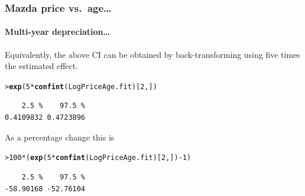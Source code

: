 \documentclass{beamer}\usepackage[]{graphicx}\usepackage[]{xcolor}
\makeatletter
\newcommand{\hlnum}[1]{\textcolor[rgb]{0.686,0.059,0.569}{#1}}%
\newcommand{\hlopt}[1]{\textcolor[rgb]{0,0,0}{#1}}%
\newcommand{\hlstd}[1]{\textcolor[rgb]{0.345,0.345,0.345}{#1}}%
\newcommand{\hlkwd}[1]{\textcolor[rgb]{0.737,0.353,0.396}{\textbf{#1}}}%
\newenvironment{kframe}{%
 \def\at@end@of@kframe{}%
 \ifinner\ifhmode%
  \def\at@end@of@kframe{\end{minipage}}%
  \begin{minipage}{\columnwidth}%
 \fi\fi%
 \def\FrameCommand##1{\hskip\@totalleftmargin \hskip-\fboxsep
 \colorbox{shadecolor}{##1}\hskip-\fboxsep
     \hskip-\linewidth \hskip-\@totalleftmargin \hskip\columnwidth}%
 \MakeFramed {\advance\hsize-\width
   \@totalleftmargin\z@ \linewidth\hsize
   \@setminipage}}%
 {\par\unskip\endMakeFramed%
 \at@end@of@kframe}
\newenvironment{knitrout}{}{} %
\makeatother
\begin{document}
\begin{frame}[fragile]
\frametitle{Mazda  price vs.\ age\ldots}
\framesubtitle{Multi-year depreciation\ldots}
Equivalently, the above CI can be obtained by back-transforming using five times the estimated effect.
\bigskip
\begin{knitrout}\scriptsize
{}\color{fgcolor}\begin{kframe}
\begin{alltt}
\hlstd{> }\hlkwd{exp}\hlstd{(}\hlnum{5}\hlopt{*}\hlkwd{confint}\hlstd{(LogPriceAge.fit)[}\hlnum{2}\hlstd{,])}
\end{alltt}
\begin{verbatim}
    2.5 %    97.5 % 
0.4109832 0.4723896 
\end{verbatim}
\end{kframe}
\end{knitrout}
\bigskip
As a percentage change this is
\medskip
\begin{knitrout}\scriptsize
{}\color{fgcolor}\begin{kframe}
\begin{alltt}
\hlstd{> }\hlnum{100}\hlopt{*}\hlstd{(}\hlkwd{exp}\hlstd{(}\hlnum{5}\hlopt{*}\hlkwd{confint}\hlstd{(LogPriceAge.fit)[}\hlnum{2}\hlstd{,])}\hlopt{-}\hlnum{1}\hlstd{)}
\end{alltt}
\begin{verbatim}
    2.5 %    97.5 % 
-58.90168 -52.76104 
\end{verbatim}
\end{kframe}
\end{knitrout}
\end{frame}


\end{document}
